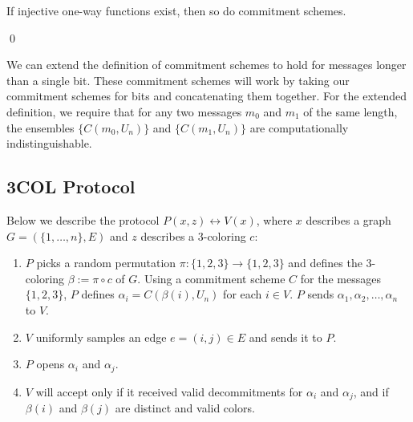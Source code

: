 \begin{theorem}
If injective one-way functions exist, then so do commitment schemes.
\end{theorem}
\qed

\medskip
We can extend the definition of commitment schemes to hold for messages longer than a single bit. These commitment schemes will work by taking our commitment schemes for bits and concatenating them together. For the extended definition, we require that for any two messages $m_0$ and $m_1$ of the same length, the ensembles $\{ C(m_0, U_n) \}$ and $\{ C(m_1, U_n) \}$ are computationally indistinguishable.

\subsection{3COL Protocol}

Below we describe the protocol $P(x,z) \leftrightarrow V(x)$, where $x$ describes a graph $G = (\{1, \ldots, n \}, E)$ and $z$ describes a 3-coloring $c$:

\begin{enumerate}
\item $P$ picks a random permutation $\pi : \{ 1, 2, 3 \} \to \{ 1, 2, 3 \}$ and defines the 3-coloring $\beta := \pi \circ c$ of $G$. Using a commitment scheme $C$ for the messages $\{ 1, 2, 3 \}$, $P$ defines $\alpha_i = C(\beta(i), U_n)$ for each $i \in V$. $P$ sends $\alpha_1, \alpha_2, \ldots, \alpha_n$ to $V$.

\item $V$ uniformly samples an edge $e = (i, j) \in E$ and sends it to $P$.

\item $P$ opens $\alpha_i$ and $\alpha_j$.

\item $V$ will accept only if it received valid decommitments for $\alpha_i$ and $\alpha_j$, and if $\beta(i)$ and $\beta(j)$ are distinct and valid colors.

\end{enumerate}


